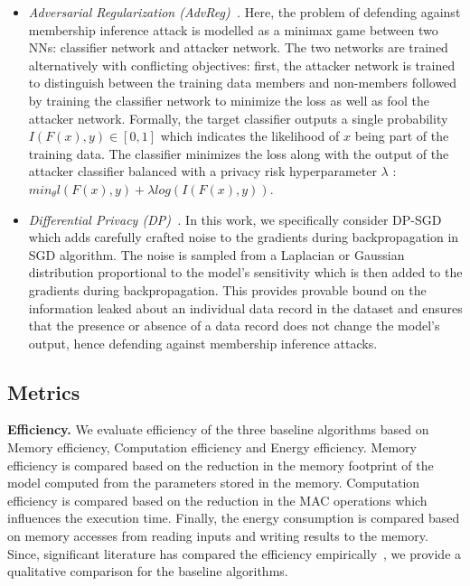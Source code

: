 \begin{itemize}[leftmargin=*]
\item {\em Adversarial Regularization (AdvReg)~\cite{DBLP:conf/ccs/NasrSH18}.} Here, the problem of defending against membership inference attack is modelled as a minimax game between two NNs: classifier network and attacker network.
The two networks are trained alternatively with conflicting objectives: first, the attacker network is trained to distinguish between the training data members and non-members followed by training the classifier network to minimize the loss as well as fool the attacker network.
Formally, the target classifier outputs a single probability $I(F(x),y) \in [0,1]$ which indicates the likelihood of $x$ being part of the training data.
The classifier minimizes the loss along with the output of the attacker classifier balanced with a privacy risk hyperparameter $\lambda$ : $min_{\theta} l(F(x),y) + \lambda log(I(F(x),y))$.

\item {\em Differential Privacy (DP)~\cite{Abadi:2016:DLD:2976749.2978318}.} In this work, we specifically consider DP-SGD which adds carefully crafted noise to the gradients during backpropagation in SGD algorithm.
The noise is sampled from a Laplacian or Gaussian distribution proportional to the model's sensitivity which is then added to the gradients during backpropagation.
This provides provable bound on the information leaked about an individual data record in the dataset and ensures that the presence or absence of a data record does not change the model's output, hence defending against membership inference attacks.
\end{itemize}

\subsection{Metrics}
\label{metrics}

\noindent\textbf{Efficiency.} We evaluate efficiency of the three baseline algorithms based on Memory efficiency, Computation efficiency and Energy efficiency. Memory efficiency is compared based on the reduction in the memory footprint of the model computed from the parameters stored in the memory. Computation efficiency is compared based on the reduction in the MAC operations which influences the execution time. Finally, the energy consumption is compared based on memory accesses from reading inputs and writing results to the memory. Since, significant literature has compared the efficiency empirically~\cite{8114708}, we provide a qualitative comparison for the baseline algorithms.


